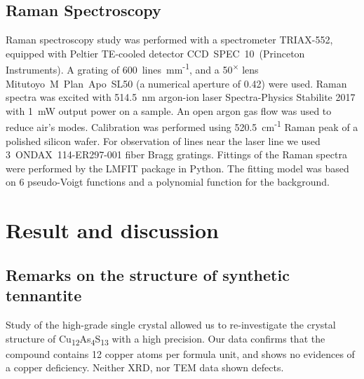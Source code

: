 \documentclass[preprint,review,12pt]{elsarticle}
\begin{document}
\subsection{Raman Spectroscopy}\label{sec:level2}
Raman spectroscopy study was performed with a spectrometer TRIAX-552, equipped with Peltier TE-cooled detector CCD~SPEC~10~(Princeton Instruments).
A grating of 600~lines~mm\textsuperscript{-1}, and a 50\textsuperscript{$\times$} lens Mitutoyo~M~Plan~Apo~SL50 (a numerical aperture of 0.42) were used. Raman spectra was excited with 514.5~nm argon-ion laser Spectra-Physics Stabilite 2017 with 1~mW output power on a sample. An open argon gas flow was used to reduce air’s modes.
Calibration was performed using 520.5~cm\textsuperscript{-1} Raman peak of a polished silicon wafer. For observation of lines near the laser line we used 3~ONDAX~114-ER297-001 fiber Bragg gratings. Fittings of the Raman spectra were performed by the LMFIT\cite{LMFIT} package in Python. The fitting model was based on 6 pseudo-Voigt functions and a polynomial function for the background.

\section{Result and discussion}\label{sec:level1}

\subsection{Remarks on the structure of synthetic tennantite}\label{sec:level2}
Study of the high-grade single crystal allowed us to re-investigate the crystal structure of Cu\textsubscript{12}As\textsubscript{4}S\textsubscript{13}  with a high precision.
Our data confirms that the compound contains 12 copper atoms per formula unit, and shows no evidences of a copper deficiency.
Neither XRD, nor TEM data shown defects.

\begin{table}
\caption{\label{tab:anis_ext}%
Anisotropic extinction parameters in Cu\textsubscript{12}As\textsubscript{4}S\textsubscript{13}.
}
\centering
{}
\end{table}
				
\end{document}
